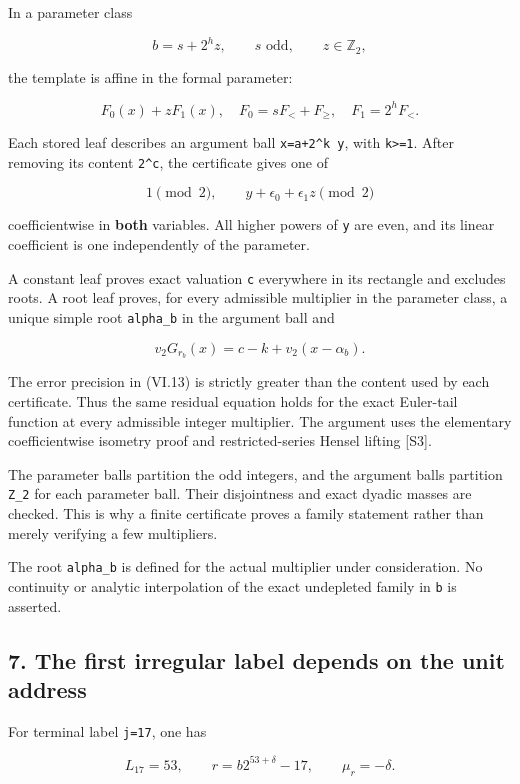 \documentclass[11pt,letterpaper]{article}
\begin{document}
In a parameter class

\[
b=s+2^h z,\qquad s\text{ odd},\qquad z\in\mathbb Z_2,
\]

the template is affine in the formal parameter:

\[
F_0(x)+zF_1(x),
\quad F_0=sF_<+F_{\ge},\quad F_1=2^hF_<.
\]

Each stored leaf describes an argument ball \texttt{x=a+2\^{}k\ y}, with \texttt{k\textgreater{}=1}. After removing its content \texttt{2\^{}c}, the certificate gives one of

\[
1\pmod2,
\qquad
 y+\epsilon_0+\epsilon_1z\pmod2
\tag{VI.14}
\]

coefficientwise in \textbf{both} variables. All higher powers of \texttt{y} are even, and its linear coefficient is one independently of the parameter.

A constant leaf proves exact valuation \texttt{c} everywhere in its rectangle and excludes roots. A root leaf proves, for every admissible multiplier in the parameter class, a unique simple root \texttt{alpha\_b} in the argument ball and

\[
\boxed{v_2G_{r_b}(x)=c-k+v_2(x-\alpha_b).} \tag{VI.15}
\]

The error precision in (VI.13) is strictly greater than the content used by each certificate. Thus the same residual equation holds for the exact Euler-tail function at every admissible integer multiplier. The argument uses the elementary coefficientwise isometry proof and restricted-series Hensel lifting {[}S3{]}.

The parameter balls partition the odd integers, and the argument balls partition \texttt{Z\_2} for each parameter ball. Their disjointness and exact dyadic masses are checked. This is why a finite certificate proves a family statement rather than merely verifying a few multipliers.

The root \texttt{alpha\_b} is defined for the actual multiplier under consideration. No continuity or analytic interpolation of the exact undepleted family in \texttt{b} is asserted.

\subsection{7. The first irregular label depends on the unit address}\label{the-first-irregular-label-depends-on-the-unit-address}

For terminal label \texttt{j=17}, one has

\[
L_{17}=53,\qquad r=b2^{53+\delta}-17,\qquad\mu_r=-\delta.
\]
\end{document}
